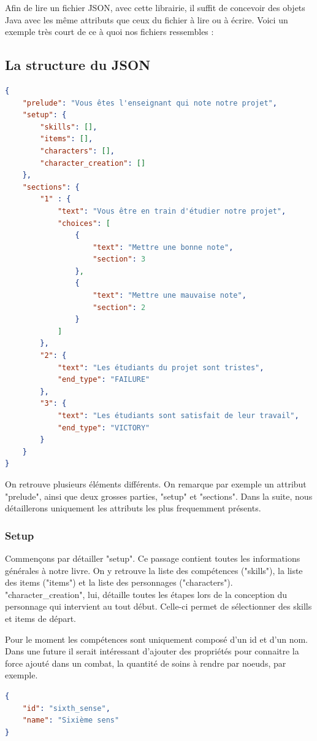 		Afin de lire un fichier JSON, avec cette librairie, il suffit de concevoir des objets Java avec les même attributs que ceux du fichier à lire ou à écrire. Voici un exemple très court de ce à quoi nos fichiers ressembles :

		\subsection{La structure du JSON}

\begin{lstlisting}[language=json, caption=Exemple de livre très simple, label=lst:exemple_livre]
{
	"prelude": "Vous êtes l'enseignant qui note notre projet",
	"setup": {
		"skills": [],
		"items": [],
		"characters": [],
		"character_creation": []
	},
	"sections": {
		"1" : {
			"text": "Vous être en train d'étudier notre projet",
			"choices": [
				{
					"text": "Mettre une bonne note",
					"section": 3
				},
				{
					"text": "Mettre une mauvaise note",
					"section": 2
				}
			]
		},
		"2": {
			"text": "Les étudiants du projet sont tristes",
			"end_type": "FAILURE"
		},
		"3": {
			"text": "Les étudiants sont satisfait de leur travail",
			"end_type": "VICTORY"
		}
	}
}
\end{lstlisting}

		On retrouve plusieurs éléments différents. On remarque par exemple un attribut "prelude", ainsi que deux grosses parties, "setup" et "sections". Dans la suite, nous détaillerons uniquement les attributs les plus frequemment présents.

		\subsubsection{Setup}

			Commençons par détailler "setup". Ce passage contient toutes les informations générales à notre livre. On y retrouve la liste des compétences ("skills"), la liste des items ("items") et la liste des personnages ("characters"). "character\_creation", lui, détaille toutes les étapes lors de la conception du personnage qui intervient au tout début. Celle-ci permet de sélectionner des skills et items de départ.

			Pour le moment les compétences sont uniquement composé d'un id et d'un nom. Dans une future \maj{} il serait intéressant d'ajouter des propriétés pour connaitre la force ajouté dans un combat, la quantité de soins à rendre par noeuds, par exemple.

\begin{lstlisting}[language=json, caption=Exemple de compétence]
{
	"id": "sixth_sense",
	"name": "Sixième sens"
}
\end{lstlisting}

